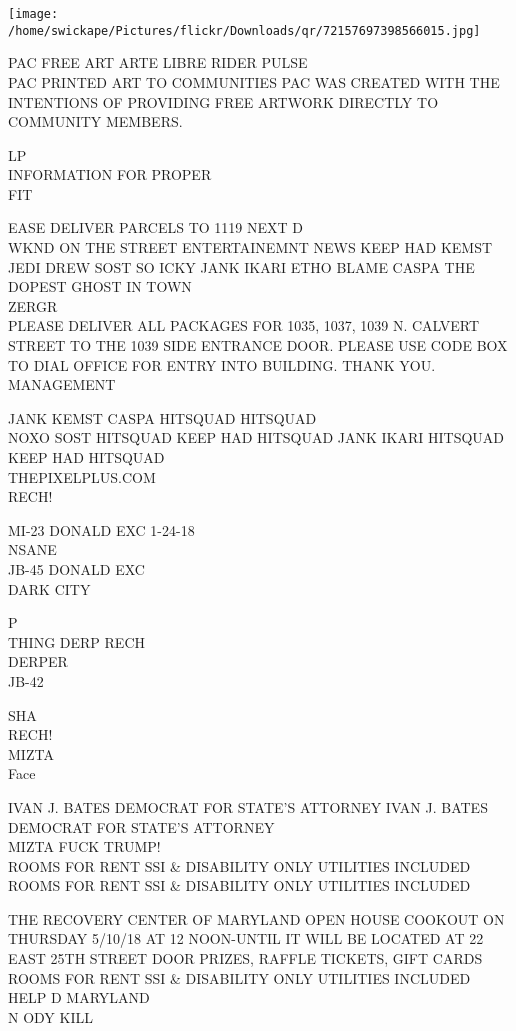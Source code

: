 \documentclass[10pt,letterpaper]{article}
\begin{document}
\texttt{[image: /home/swickape/Pictures/flickr/Downloads/qr/72157697398566015.jpg]}
\pagebreak

PAC FREE ART ARTE LIBRE RIDER PULSE\\
PAC PRINTED ART TO COMMUNITIES PAC WAS CREATED WITH THE INTENTIONS OF PROVIDING FREE ARTWORK DIRECTLY TO COMMUNITY MEMBERS.

LP\\
INFORMATION FOR PROPER\\
FIT

EASE DELIVER PARCELS TO 1119 NEXT D\\
WKND ON THE STREET ENTERTAINEMNT NEWS KEEP HAD KEMST JEDI DREW SOST SO ICKY JANK IKARI ETHO BLAME CASPA THE DOPEST GHOST IN TOWN\\
ZERGR\\
PLEASE DELIVER ALL PACKAGES FOR 1035, 1037, 1039 N. CALVERT STREET TO THE 1039 SIDE ENTRANCE DOOR.  PLEASE USE CODE BOX TO DIAL OFFICE FOR ENTRY INTO BUILDING.  THANK YOU.  MANAGEMENT

JANK KEMST CASPA HITSQUAD HITSQUAD\\
NOXO SOST HITSQUAD KEEP HAD HITSQUAD JANK IKARI HITSQUAD KEEP HAD HITSQUAD\\
THEPIXELPLUS.COM\\
RECH!

MI{-}23 DONALD EXC 1{-}24{-}18\\
NSANE\\
JB{-}45 DONALD EXC\\
DARK CITY

P\\
THING DERP RECH\\
DERPER\\
JB{-}42

SHA\\
RECH!\\
MIZTA\\
Face

IVAN J. BATES DEMOCRAT FOR STATE'S ATTORNEY IVAN J. BATES DEMOCRAT FOR STATE'S ATTORNEY\\
MIZTA FUCK TRUMP!\\
ROOMS FOR RENT SSI \& DISABILITY ONLY UTILITIES INCLUDED\\
ROOMS FOR RENT SSI \& DISABILITY ONLY UTILITIES INCLUDED

THE RECOVERY CENTER OF MARYLAND OPEN HOUSE COOKOUT ON THURSDAY 5/10/18 AT 12 NOON{-}UNTIL IT WILL BE LOCATED AT 22 EAST 25TH STREET DOOR PRIZES, RAFFLE TICKETS, GIFT CARDS\\
ROOMS FOR RENT SSI \& DISABILITY ONLY UTILITIES INCLUDED\\
HELP D MARYLAND\\
N ODY KILL
\end{document}

